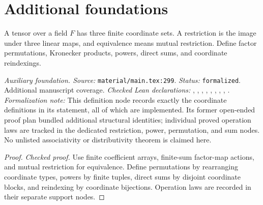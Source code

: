 \section{Additional foundations}

\renewcommand{\thetheorem}{A1}
\begin{definition}
\label{aux:tensor-calculus}
\leanok
{}
A tensor over a field $F$ has three finite coordinate sets. A restriction is the image under three linear maps, and equivalence means mutual restriction. Define factor permutations, Kronecker products, powers, direct sums, and coordinate reindexings.
\end{definition}

\noindent\textit{Auxiliary foundation. Source:} \texttt{material/main.tex:299}.
\textit{Status:} \texttt{formalized}. Additional manuscript coverage.
\textit{Checked Lean declarations:} , , , , , , , , .
\textit{Formalization note:} This definition node records exactly the coordinate definitions in its statement, all of which are implemented. Its former open-ended proof plan bundled additional structural identities; individual proved operation laws are tracked in the dedicated restriction, power, permutation, and sum nodes. No unlisted associativity or distributivity theorem is claimed here.

\begin{proof}
\leanok
\textit{Checked proof.} Use finite coefficient arrays, finite-sum factor-map actions, and mutual restriction for equivalence. Define permutations by rearranging coordinate types, powers by finite tuples, direct sums by disjoint coordinate blocks, and reindexing by coordinate bijections. Operation laws are recorded in their separate support nodes.
\end{proof}

